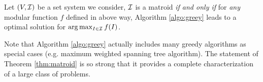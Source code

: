 \begin{theorem}
  \label{thm:matroid}
  Let $(V, \mathcal{I})$ be a set system we consider, $\mathcal{I}$ is a matroid \emph{if and only if} for \emph{any} modular function $f$ defined in above way, Algorithm \ref{algo:greey} leads to a optimal solution for $\arg\max_{I\in \mathcal{I}} f(I)$.
\end{theorem}
Note that Algorithm \ref{algo:greey} actually includes many greedy algorithms as special cases (e.g. maximum weighted spanning tree algorithm). The statement of Theorem \ref{thm:matroid} is so strong that it provides a complete  characterization of a large class of problems.














